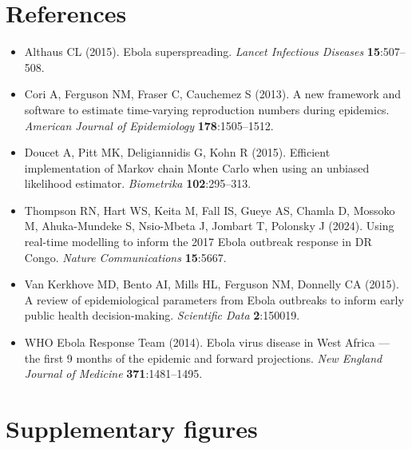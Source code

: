 \documentclass[11pt,a4paper]{article}
\theoremstyle{plain}
\theoremstyle{definition}
\begin{document}
\section*{References}
\begin{itemize}[label={}]
  \item Althaus CL (2015). Ebola superspreading. \emph{Lancet Infectious Diseases}
    \textbf{15}:507--508.
  \item Cori A, Ferguson NM, Fraser C, Cauchemez S (2013). A new framework and software to
    estimate time-varying reproduction numbers during epidemics. \emph{American Journal of
    Epidemiology} \textbf{178}:1505--1512.
  \item Doucet A, Pitt MK, Deligiannidis G, Kohn R (2015). Efficient implementation of Markov
    chain Monte Carlo when using an unbiased likelihood estimator. \emph{Biometrika}
    \textbf{102}:295--313.
  \item Thompson RN, Hart WS, Keita M, Fall IS, Gueye AS, Chamla D, Mossoko M, Ahuka-Mundeke S,
    Nsio-Mbeta J, Jombart T, Polonsky J (2024). Using real-time modelling to inform the 2017
    Ebola outbreak response in DR Congo. \emph{Nature Communications} \textbf{15}:5667.
  \item Van Kerkhove MD, Bento AI, Mills HL, Ferguson NM, Donnelly CA (2015). A review of
    epidemiological parameters from Ebola outbreaks to inform early public health
    decision-making. \emph{Scientific Data} \textbf{2}:150019.
  \item WHO Ebola Response Team (2014). Ebola virus disease in West Africa --- the first
    9 months of the epidemic and forward projections. \emph{New England Journal of Medicine}
    \textbf{371}:1481--1495.
\end{itemize}

\clearpage
\section*{Supplementary figures}
\renewcommand{\thefigure}{S\arabic{figure}}
\renewcommand{\theHfigure}{supplementary.\arabic{figure}}
\setcounter{figure}{0}
\end{document}
